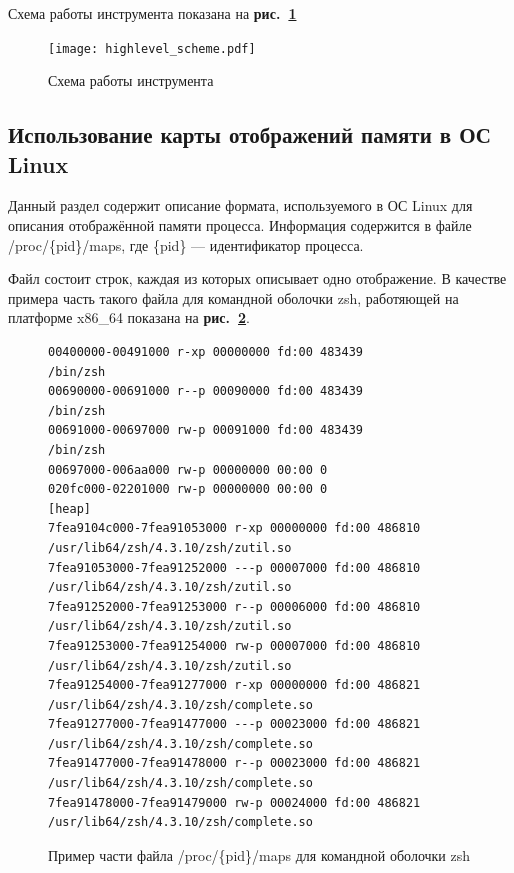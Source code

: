 \documentclass[a4paper,12pt,russian]{article}
\newcommand{\picref}[1]{\textbf{рис.~\ref{#1}}}
\newcommand{\code}[1]{\textsf{#1}}
\begin{document}
Схема работы инструмента показана на \picref{highlevel_scheme_fig}

\begin{figure}[h!]
  \center
  \texttt{[image: highlevel\_scheme.pdf]}
  \hfill
  \caption{Схема работы инструмента}
  \label{highlevel_scheme_fig}
\end{figure}


\subsection{Использование карты отображений памяти в ОС \code{Linux}}
Данный раздел содержит описание формата, используемого в ОС \code{Linux} для описания отображённой памяти процесса.
Информация содержится в файле \code{/proc/\{pid\}/maps}, где \code{\{pid\}} --- идентификатор процесса.

Файл состоит строк, каждая из которых описывает одно отображение.
В качестве примера часть такого файла для командной оболочки \code{zsh}, работяющей на платформе \code{x86\_64} показана на \picref{zsh_maps_lst}.

\begin{figure}[h]
\begin{lstlisting}[basicstyle=\tiny, numbers=none]
00400000-00491000 r-xp 00000000 fd:00 483439              /bin/zsh
00690000-00691000 r--p 00090000 fd:00 483439              /bin/zsh
00691000-00697000 rw-p 00091000 fd:00 483439              /bin/zsh
00697000-006aa000 rw-p 00000000 00:00 0
020fc000-02201000 rw-p 00000000 00:00 0                   [heap]
7fea9104c000-7fea91053000 r-xp 00000000 fd:00 486810      /usr/lib64/zsh/4.3.10/zsh/zutil.so
7fea91053000-7fea91252000 ---p 00007000 fd:00 486810      /usr/lib64/zsh/4.3.10/zsh/zutil.so
7fea91252000-7fea91253000 r--p 00006000 fd:00 486810      /usr/lib64/zsh/4.3.10/zsh/zutil.so
7fea91253000-7fea91254000 rw-p 00007000 fd:00 486810      /usr/lib64/zsh/4.3.10/zsh/zutil.so
7fea91254000-7fea91277000 r-xp 00000000 fd:00 486821      /usr/lib64/zsh/4.3.10/zsh/complete.so
7fea91277000-7fea91477000 ---p 00023000 fd:00 486821      /usr/lib64/zsh/4.3.10/zsh/complete.so
7fea91477000-7fea91478000 r--p 00023000 fd:00 486821      /usr/lib64/zsh/4.3.10/zsh/complete.so
7fea91478000-7fea91479000 rw-p 00024000 fd:00 486821      /usr/lib64/zsh/4.3.10/zsh/complete.so
\end{lstlisting}
\caption{Пример части файла \code{/proc/\{pid\}/maps} для командной оболочки \code{zsh}}
\label{zsh_maps_lst}
\end{figure}
\end{document}
